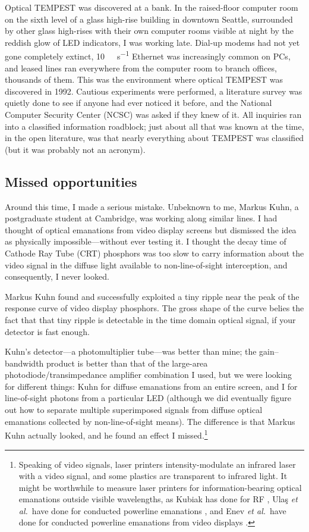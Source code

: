 \documentclass[conference]{IEEEtran}
\begin{document}
Optical TEMPEST was discovered at a bank. In the raised-floor computer room
on the sixth level of a glass high-rise building in downtown Seattle,
surrounded by other glass high-rises with their own computer rooms visible at
night by the reddish glow of LED indicators, I was working late. Dial-up
modems had not yet gone completely extinct, \SI{10}{\mega\bit\per\second}
Ethernet was increasingly common on PCs, and leased lines ran everywhere from
the computer room to branch offices, thousands of them. This was the
environment where optical TEMPEST was discovered in 1992. Cautious
experiments were performed, a literature survey was quietly done to see if
anyone had ever noticed it before, and the National Computer Security Center
(NCSC) was asked if they knew of it. All inquiries ran into a classified
information roadblock; just about all that was known at the time, in the open
literature, was that nearly everything about TEMPEST was classified (but it
was probably not an acronym).

\subsection{Missed opportunities}

Around this time, I made a serious mistake. Unbeknown to me, Markus Kuhn, a
postgraduate student at Cambridge, was working along similar lines. I had
thought of optical emanations from video display screens but dismissed the
idea as physically impossible---without ever testing it. I thought the decay
time of Cathode Ray Tube (CRT) phosphors was too slow to carry information
about the video signal in the diffuse light available to non-line-of-sight
interception, and consequently, I never looked.

Markus Kuhn found and successfully exploited a tiny ripple near the peak of
the response curve of video display phosphors. The gross shape of the curve
belies the fact that that tiny ripple is detectable in the time domain
optical signal, if your detector is fast enough.

Kuhn's detector---a photomultiplier tube---was better than mine; the
gain--bandwidth product is better than that of the large-area
photodiode/transimpedance amplifier combination I used, but we were looking
for different things: Kuhn for diffuse emanations from an entire screen, and
I for line-of-sight photons from a particular LED (although we did eventually
figure out how to separate multiple superimposed signals from diffuse optical
emanations collected by non-line-of-sight means). The difference is that
Markus Kuhn actually looked, and he found an effect I
missed.\footnote{Speaking of video signals, laser printers intensity-modulate
an infrared laser with a video signal, and some plastics are transparent to
infrared light. It might be worthwhile to measure laser printers for
information-bearing optical emanations outside visible wavelengths, as Kubiak
has done for RF \cite{Kubiak2014,Kubiak2017,Kubiak2017b,Kubiak2017c},
Ula\c{s} {\it et al.}\ have done for conducted powerline emanations
\cite{Ulas2016}, and Enev {\it et al.}\ have done for conducted powerline
emanations from video displays \cite{Enev2011}.}
\end{document}
